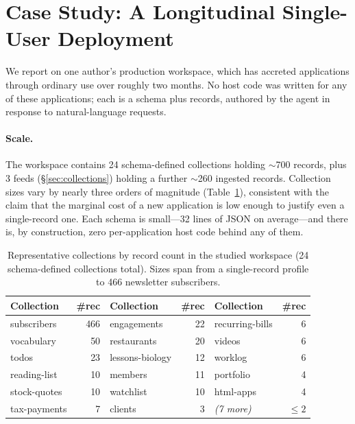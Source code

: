 \documentclass[11pt]{article}
\begin{document}
\section{Case Study: A Longitudinal Single-User Deployment}
\label{sec:casestudy}

We report on one author's production workspace, which has accreted applications
through ordinary use over roughly two months. No host code was written for any of
these applications; each is a schema plus records, authored by the agent in
response to natural-language requests.

\paragraph{Scale.}
The workspace contains 24 schema-defined collections holding $\sim$700 records,
plus 3 feeds (\S\ref{sec:collections}) holding a further $\sim$260 ingested
records. Collection sizes vary by nearly three orders of magnitude
(Table~\ref{tab:collections}), consistent with the claim that the marginal cost of
a new application is low enough to justify even a single-record one. Each schema is
small---32 lines of JSON on average---and there is, by construction, zero
per-application host code behind any of them.

\begin{table}[t]
\centering
\small
\begin{tabular}{@{}lr lr lr@{}}
\toprule
Collection & \#rec & Collection & \#rec & Collection & \#rec \\
\midrule
subscribers      & 466 & engagements & 22 & recurring-bills & 6 \\
vocabulary       & 50  & restaurants & 20 & videos          & 6 \\
todos            & 23  & lessons-biology & 12 & worklog      & 6 \\
reading-list     & 10  & members         & 11 & portfolio    & 4 \\
stock-quotes     & 10  & watchlist       & 10 & html-apps    & 4 \\
tax-payments     & 7   & clients         & 3  & \emph{(7 more)} & $\le 2$ \\
\bottomrule
\end{tabular}
\caption{Representative collections by record count in the studied workspace
(24 schema-defined collections total). Sizes span from a single-record profile to
466 newsletter subscribers.}
\label{tab:collections}
\end{table}
\end{document}
